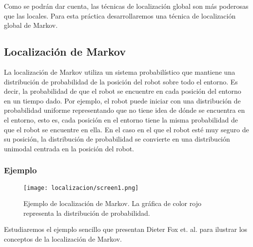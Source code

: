 Como se podrán dar cuenta, las técnicas de localización global son más poderosas que las locales. Para esta práctica desarrollaremos una técnica de localización global de Markov.

\subsection{Localización de Markov}

La localización de Markov utiliza un sistema probabilístico que mantiene una distribución de probabilidad de la posición del robot sobre todo el entorno. Es decir, la probabilidad de que el robot se encuentre en cada posición del entorno en un tiempo dado. Por ejemplo, el robot puede iniciar con una distribución de probabilidad uniforme representando que no tiene idea de dónde se encuentra en el entorno, esto es, cada posición en el entorno tiene la misma probabilidad de que el robot se encuentre en ella. En el caso en el que el robot esté muy seguro de su posición, la distribución de probabilidad se convierte en una distribución unimodal centrada en la posición del robot.

\subsubsection{Ejemplo}

\begin{figure}
  \centering
  \texttt{[image: localizacion/screen1.png]}
  \caption{Ejemplo de localización de Markov. La gráfica de color rojo representa la distribución de probabilidad. \parencite{Dieter1999}}
  \label{fig:screen1}
\end{figure}


Estudiaremos el ejemplo sencillo que presentan Dieter Fox et. al. para ilustrar los conceptos de la localización de Markov.



